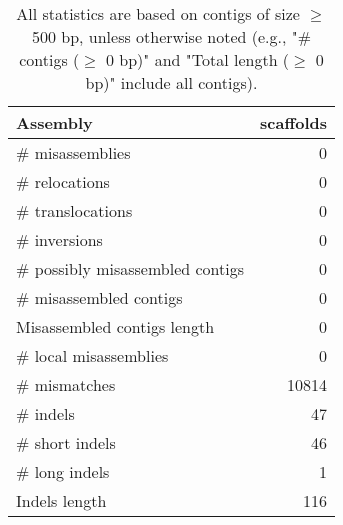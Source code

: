 \documentclass[12pt,a4paper]{article}
\begin{document}
\begin{table}[ht]
\begin{center}
\caption{All statistics are based on contigs of size $\geq$ 500 bp, unless otherwise noted (e.g., "\# contigs ($\geq$ 0 bp)" and "Total length ($\geq$ 0 bp)" include all contigs).}
\begin{tabular}{|l*{1}{|r}|}
\hline
Assembly & scaffolds \\ \hline
\# misassemblies & 0 \\ \hline
\hspace{5mm}\# relocations & 0 \\ \hline
\hspace{5mm}\# translocations & 0 \\ \hline
\hspace{5mm}\# inversions & 0 \\ \hline
\# possibly misassembled contigs & 0 \\ \hline
\# misassembled contigs & 0 \\ \hline
Misassembled contigs length & 0 \\ \hline
\# local misassemblies & 0 \\ \hline
\# mismatches & 10814 \\ \hline
\# indels & 47 \\ \hline
\hspace{5mm}\# short indels & 46 \\ \hline
\hspace{5mm}\# long indels & 1 \\ \hline
Indels length & 116 \\ \hline
\end{tabular}
\end{center}
\end{table}
\end{document}
